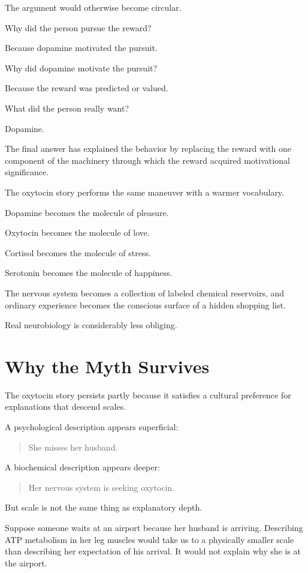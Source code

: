 \documentclass[12pt]{article}
\begin{document}
The argument would otherwise become circular.

Why did the person pursue the reward?

Because dopamine motivated the pursuit.

Why did dopamine motivate the pursuit?

Because the reward was predicted or valued.

What did the person really want?

Dopamine.

The final answer has explained the behavior by replacing the reward with one component of the machinery through which the reward acquired motivational significance.

The oxytocin story performs the same maneuver with a warmer vocabulary.

Dopamine becomes the molecule of pleasure.

Oxytocin becomes the molecule of love.

Cortisol becomes the molecule of stress.

Serotonin becomes the molecule of happiness.

The nervous system becomes a collection of labeled chemical reservoirs, and ordinary experience becomes the conscious surface of a hidden shopping list.

Real neurobiology is considerably less obliging.

\section{Why the Myth Survives}

The oxytocin story persists partly because it satisfies a cultural preference for explanations that descend scales.

A psychological description appears superficial:

\begin{quote}
She misses her husband.
\end{quote}

A biochemical description appears deeper:

\begin{quote}
Her nervous system is seeking oxytocin.
\end{quote}

But scale is not the same thing as explanatory depth.

Suppose someone waits at an airport because her husband is arriving. Describing ATP metabolism in her leg muscles would take us to a physically smaller scale than describing her expectation of his arrival. It would not explain why she is at the airport.
\end{document}
